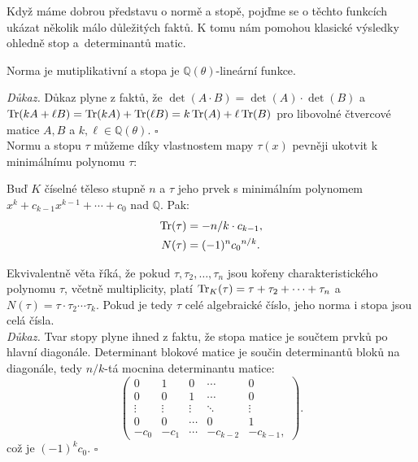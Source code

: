 \documentclass[12pt]{report}
\begin{document}
Když máme dobrou představu o normě a stopě, pojďme se o těchto funkcích ukázat několik málo důležitých faktů. K tomu nám pomohou klasické výsledky ohledně stop a~determinantů matic.

\begin{veta}
Norma je mutiplikativní a stopa je $\mathbb{Q}(\theta)$-lineární funkce.
\end{veta}
\noindent \textit{Důkaz.} Důkaz plyne z faktů, že $\det(A \cdot B) = \det(A) \cdot \det(B)$ a $\operatorname{Tr}(kA+\ell B) = \operatorname{Tr}(kA) + \operatorname{Tr}(\ell B) = k\operatorname{Tr}(A)+\ell \operatorname{Tr}(B)$ pro libovolné čtvercové matice $A,B$ a $k,\ell \in \mathbb{Q}(\theta)$. \hfill $\square$\\

Normu a stopu $\tau$ můžeme díky vlastnostem mapy $\tau(x)$ pevněji ukotvit k minimálnímu polynomu $\tau$:

\begin{veta}
Buď $K$ číselné těleso stupně $n$ a $\tau$ jeho prvek s minimálním polynomem $x^k + c_{k-1} x^{k-1} + \cdots  + c_0$ nad $\mathbb{Q}$. Pak:
\begin{align*}
\operatorname{Tr}(\tau) &= - n/k \cdot c_{k-1},\\
N(\tau) &= (-1)^n {c_0}^{n/k}.
\end{align*} 
\end{veta}

Ekvivalentně věta říká, že pokud $\tau, \tau_2,\dots,\tau_n$ jsou kořeny charakteristického polynomu $\tau$, včetně multiplicity, platí $\operatorname{Tr}_K(\tau) = \tau + \tau_2+\cdots+\tau_n$ a $N(\tau) = \tau \cdot \tau_2 \cdots \tau_k$. Pokud je tedy $\tau$ celé algebraické číslo, jeho norma i stopa jsou celá čísla.\\

\noindent\textit{Důkaz.} Tvar stopy plyne ihned z faktu, že stopa matice je součtem prvků po hlavní diagonále.  Determinant blokové matice je součin determinantů bloků na diagonále, tedy $n/k$-tá mocnina determinantu matice:
\begin{equation*}
 \begin{pmatrix}
0 & 1 & 0 & \cdots & 0\\
0 & 0 & 1 & \cdots & 0\\
\vdots & \vdots & \vdots & \ddots &\vdots\\
0 & 0 & \cdots & 0& 1\\
-c_0 & -c_1 & \cdots & -c_{k-2} & -c_{k-1},
\end{pmatrix}.
\end{equation*}
což je $(-1)^k c_{0}$. \hfill $\square$\\
\end{document}
